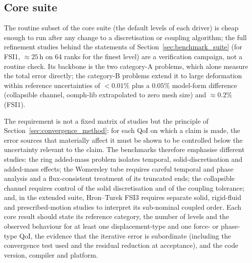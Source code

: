 \subsection{Core suite}\label{sec:core_suite}

The routine subset of the core suite (the default levels of each driver) is cheap enough to run after any change to a discretisation or coupling algorithm; the full refinement studies behind the statements of Section~\ref{sec:benchmark_suite} (for FSI1, $\approx25$\,h on 64 ranks for the finest level) are a verification campaign, not a routine check.
Its backbone is the two category-A problems, which alone measure the total error directly; the category-B problems extend it to large deformation within reference uncertainties of $<0.01\%$ plus a $0.05\%$ model-form difference (collapsible channel, oomph-lib extrapolated to zero mesh size) and $\approx0.2\%$ (FSI1).

The requirement is not a fixed matrix of studies but the principle of Section~\ref{sec:convergence_method}: for each QoI on which a claim is made, the error sources that materially affect it must be shown to be controlled below the uncertainty relevant to the claim.
The benchmarks therefore emphasise different studies: the ring added-mass problem isolates temporal, solid-discretisation and added-mass effects; the Womersley tube requires careful temporal and phase analysis and a flux-consistent treatment of its truncated ends; the collapsible channel requires control of the solid discretisation and of the coupling tolerance; and, in the extended suite, Hron--Turek FSI3 requires separate solid, rigid-fluid and prescribed-motion studies to interpret its sub-nominal coupled order.
Each core result should state its reference category, the number of levels and the observed behaviour for at least one displacement-type and one force- or phase-type QoI, the evidence that the iterative error is subordinate (including the convergence test used and the residual reduction at acceptance), and the code version, compiler and platform.


